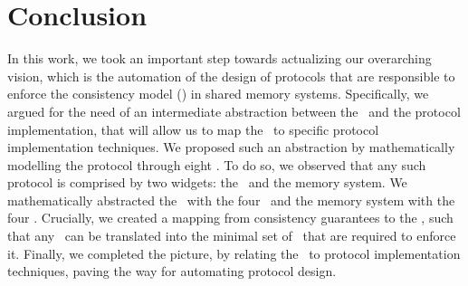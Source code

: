 \section{Conclusion}
\label{sec:conclusion}

In this work, we took an important step towards actualizing our overarching vision, which is the automation of the design of protocols that are responsible to enforce the consistency model (\mcm) in shared memory systems.
Specifically, we argued for the need of an intermediate abstraction between the \mcm\ and the protocol implementation, that will allow us to map the  \mcm\ to specific protocol implementation techniques.
We proposed such an abstraction by mathematically modelling the protocol through eight \rts. 
To do so, we observed that any such protocol is comprised by two widgets: the \rob\ and the memory system. We mathematically abstracted the \rob\ with the four \prts\  and the memory system with the four \srts. 
Crucially, we created a mapping from consistency guarantees to the \rts, such that any  \mcm\ can be translated into the minimal set of \rts\ that are required to enforce it. Finally, we completed the picture, by relating the \rts\ to protocol implementation  techniques, paving the way for automating protocol design.




